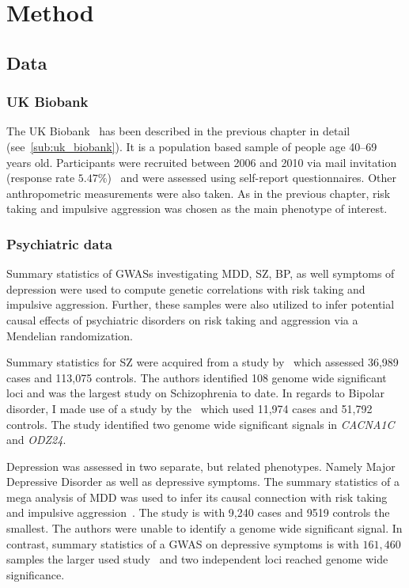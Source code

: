 \section{Method}
\label{sec:method_psych}

\subsection{Data}
\label{sub:data}

\subsubsection{UK Biobank}
\label{ssub:uk_biobank_psych}

The UK Biobank~\cite{Allen2014} has been described in the previous chapter in detail (see~\ref{sub:uk_biobank}).
It is a population based sample of people age 40--69 years old. 
Participants were recruited between 2006 and 2010 via mail invitation (response rate $5.47\%$)~\cite{Sudlow2015} and were assessed using self-report questionnaires. Other anthropometric measurements were also taken.
As in the previous chapter, risk taking and impulsive aggression was chosen as the main phenotype of interest.

\subsubsection{Psychiatric data}
\label{ssub:psychiatric_data}

Summary statistics of GWASs investigating MDD, SZ, BP, as well symptoms of depression were used to compute genetic correlations with risk taking and impulsive aggression.
Further, these samples were also utilized to infer potential causal effects of psychiatric disorders on risk taking and aggression via a Mendelian randomization.

Summary statistics for SZ were acquired from a study by~\citet{Ripke2014} which assessed 36,989 cases and 113,075 controls.
The authors identified 108 genome wide significant loci and was the largest study on Schizophrenia to date.
In regards to Bipolar disorder, I made use of a study by the~\citet{PsychiatricGWASConsortiumBipolarDisorderWorkingGroup2011} which used 11,974 cases and 51,792 controls.
The study identified two genome wide significant signals in \textit{CACNA1C} and \textit{ODZ24}.

Depression was assessed in two separate, but related phenotypes. 
Namely Major Depressive Disorder as well as depressive symptoms.
The summary statistics of a mega analysis of MDD was used to infer its causal connection with risk taking and impulsive aggression~\cite{MajorDepressiveDisorderWorkingGroupofthePsychiatricGWASConsortium2013}.
The study is with 9,240 cases and 9519 controls the smallest. 
The authors were unable to identify a genome wide significant signal.
In contrast, summary statistics of a GWAS on depressive symptoms is with $161,460$ samples the larger used study~\cite{Okbay2016} and two independent loci reached genome wide significance.  

